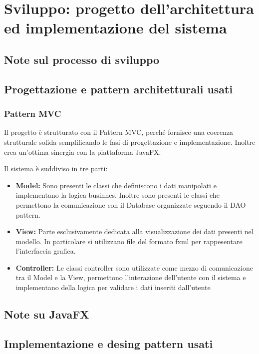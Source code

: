 \documentclass{article}
\begin{document}
\newpage
\section{Sviluppo: progetto dell'architettura ed implementazione del sistema}
\subsection{Note sul processo di sviluppo}
\subsection{Progettazione e pattern architetturali usati}
\subsubsection{Pattern MVC}
Il progetto è strutturato con il Pattern MVC, perché fornisce una coerenza strutturale solida 
semplificando le fasi di progettazione e implementazione. Inoltre crea un'ottima sinergia con la
piattaforma JavaFX.

\noindent Il sistema è suddiviso in tre parti:
\begin{itemize}
    \item{\textbf{Model:}
            Sono presenti le classi che definiscono i dati manipolati
            e implementano la logica businnes.
            Inoltre sono presenti le classi che permettono la comunicazione
            con il Database organizzate seguendo il DAO pattern.
        }
    \item{\textbf{View:}
            Parte esclusivamente dedicata alla visualizzazione dei dati
            presenti nel modello.
            In particolare si utilizzano file del formato fxml per rappesentare
            l'interfaccia grafica.
        }
    \item{\textbf{Controller:}
            Le classi controller sono utilizzate come mezzo di comunicazione
            tra il Model e la View, permettono l'interazione dell'utente con il
            sistema e implementano della logica per validare i dati inseriti dall'utente
        }
\end{itemize}
\subsection{Note su JavaFX}
\subsection{Implementazione e desing pattern usati}
\end{document}
